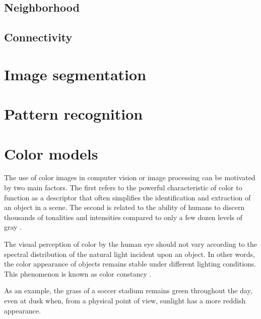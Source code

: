 \subsection{Neighborhood}
\label{sec:neighborhood}

\subsection{Connectivity}
\label{sec:connectivity}

\section{Image segmentation}
\label{sec:image_segmentation}

\section{Pattern recognition}
\label{sec:pattern_recognition}

\section{Color models}
\label{sec:color_models}

The use of color images in computer vision or image processing can be motivated by two main factors. The first refers to the powerful characteristic of color to function as a descriptor that often simplifies the identification and extraction of an object in a scene. The second is related to the ability of humans to discern thousands of tonalities and intensities compared to only a few dozen levels of gray \citep{gonzalez:02}.

The visual perception of color by the human eye should not vary according to the spectral distribution of the natural light incident upon an object. In other words, the color appearance of objects remains stable under different lighting conditions. This phenomenon is known as color constancy \citep{gevers:12}.

As an example, the grass of a soccer stadium remains green throughout the day, even at dusk when, from a physical point of view, sunlight has a more reddish appearance.

